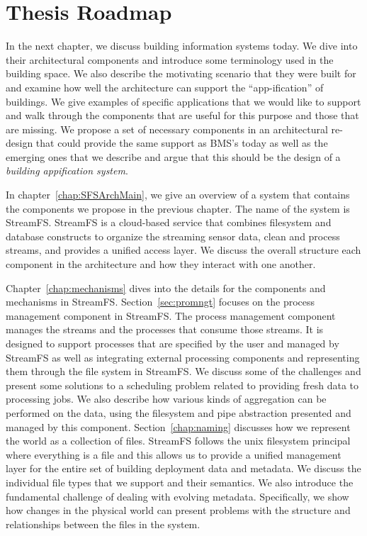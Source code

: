 \section{Thesis Roadmap}
In the next chapter, we discuss building information systems today.  We dive into their architectural components and introduce some terminology
used in the building space.  We also describe the motivating scenario that they were built for and examine how well the architecture 
can support the ``app-ification'' of buildings.  We give examples of specific applications that we would like to support
and walk through the components that are useful for this purpose and those that are missing.  We propose a set of necessary
components in an architectural re-design that could provide the same support as BMS's today as well as the emerging ones that we
describe and argue that this should be the design of a \emph{building appification system}.

In chapter~\ref{chap:SFSArchMain}, we give an overview of a system that contains the components we propose in the previous
chapter.  The name of the system is StreamFS.  StreamFS is a cloud-based service that combines filesystem and database constructs
to organize the streaming sensor data, clean and process streams, and provides a unified access layer.
We discuss the overall structure each component in the architecture and how they interact with one another.

Chapter~\ref{chap:mechanisms} dives into the details for the components and mechanisms in StreamFS.
Section~\ref{sec:promngt} focuses on the process management component in StreamFS.  The process management component
manages the streams and the processes that consume those streams.  It is designed to support processes that are specified by the user
and managed by StreamFS as well as integrating external processing components and representing them through the file system in StreamFS.
We discuss some of the challenges and present some solutions to a scheduling problem related to providing fresh data  to processing jobs.
We also describe how various kinds of aggregation can be performed on the data, using the filesystem and pipe abstraction
presented and managed by this component.
Section~\ref{chap:naming} discusses how we represent the world as a collection of files.  StreamFS follows the unix filesystem principal 
where everything is a file and this allows us to provide a unified management layer for the entire set of building deployment
data and metadata.  We discuss the individual file types that we support and their semantics.  We also introduce the fundamental
challenge of dealing with evolving metadata.  Specifically,  we show how changes in the physical world can present problems
with the structure and relationships between the files in the system.  

